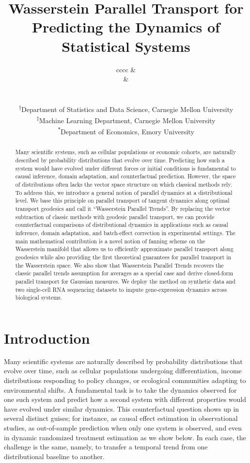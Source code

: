 \documentclass[11pt]{article}
\title{Wasserstein Parallel Transport for Predicting the Dynamics of Statistical Systems}
\author{
\begin{tabular}{cccc} %
\multicolumn{2}{c}{\makecell[c]{Tristan Luca Saidi\textsuperscript{\(\dagger\)}\\ \href{mailto:tsaidi@andrew.cmu.edu}{\nolinkurl{tsaidi@andrew.cmu.edu}}}} &
\multicolumn{2}{c}{\makecell[c]{Gonzalo Mena\textsuperscript{\(\dagger\)}\\ \href{mailto:gmena@andrew.cmu.edu}{\nolinkurl{gmena@andrew.cmu.edu}}}} \\[2em]
\multicolumn{2}{c}{\makecell[c]{Larry Wasserman\textsuperscript{\(\dagger, \ddagger\)}\\ \href{mailto:larry@stat.cmu.edu}{\nolinkurl{larry@stat.cmu.edu}}}} &
\multicolumn{2}{c}{\makecell[c]{Florian Gunsilius\textsuperscript{\(*\)}\\ \href{mailto:florian.felix.gunsilius@emory.edu}{\nolinkurl{fgunsil@emory.edu}}}} \\[1.5em]
\end{tabular}
\small\\ %
\textsuperscript{\(\dagger\)}Department of Statistics and Data Science, Carnegie Mellon University\\
\textsuperscript{\(\ddagger\)}Machine Learning Department, Carnegie Mellon University\\
\textsuperscript{\(*\)}Department of Economics, Emory University
}
\begin{document}
\maketitle


\begin{abstract}
    Many scientific systems, such as cellular populations or economic cohorts, are naturally described by probability distributions that evolve over time. Predicting how such a system would have evolved under different forces or initial conditions is fundamental to causal inference, domain adaptation, and counterfactual prediction. However, the space of distributions often lacks the vector space structure on which classical methods rely. To address this, we introduce a general notion of parallel dynamics at a distributional level. We base this principle on parallel transport of tangent dynamics along optimal transport geodesics and call it ``Wasserstein Parallel Trends''. By replacing the vector subtraction of classic methods with geodesic parallel transport, we can provide counterfactual comparisons of distributional dynamics in applications such as causal inference, domain adaptation, and batch-effect correction in experimental settings. The main mathematical contribution is a novel notion of fanning scheme on the Wasserstein manifold that allows us to efficiently approximate parallel transport along geodesics while also providing the first theoretical guarantees for parallel transport in the Wasserstein space. We also show that Wasserstein Parallel Trends recovers the classic parallel trends assumption for averages as a special case and derive closed-form parallel transport for Gaussian measures. We deploy the method on synthetic data and two single-cell RNA sequencing datasets to impute gene-expression dynamics across biological systems.
\end{abstract}



\tableofcontents

\section{Introduction}
Many scientific systems are naturally described by probability distributions that evolve over time, such as  cellular populations undergoing differentiation, income distributions responding to policy changes, or ecological communities adapting to environmental shifts. A fundamental task is to take the dynamics observed for one such system and predict how a second system with different properties would have evolved under similar dynamics. This counterfactual question shows up in several distinct guises; for instance, as causal effect estimation in observational studies, as out-of-sample prediction when only one system is observed, and even in dynamic randomized treatment estimation as we show below. In each case, the challenge is the same, namely, to transfer a temporal trend from one distributional baseline to another.
\end{document}
